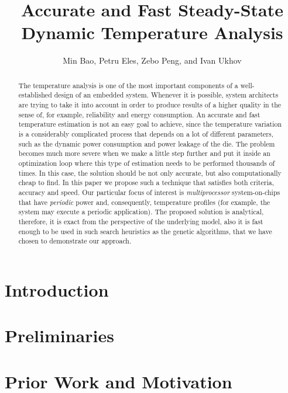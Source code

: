 \documentclass[conference]{IEEEtran}
\title{Accurate and Fast Steady-State\\Dynamic Temperature Analysis}
\author{Min Bao, Petru Eles, Zebo Peng, and Ivan Ukhov}
\begin{document}
  \maketitle

  \begin{abstract}
    The temperature analysis is one of the most important components of a well-established design of an embedded system. Whenever it is possible, system architects are trying to take it into account in order to produce results of a higher quality in the sense of, for example, reliability and energy consumption. An accurate and fast temperature estimation is not an easy goal to achieve, since the temperature variation is a considerably complicated process that depends on a lot of different parameters, such as the dynamic power consumption and power leakage of the die. The problem becomes much more severe when we make a little step further and put it inside an optimization loop where this type of estimation needs to be performed thousands of times. In this case, the solution should be not only accurate, but also computationally cheap to find. In this paper we propose such a technique that satisfies both criteria, accuracy and speed. Our particular focus of interest is \emph{multiprocessor} system-on-chips that have \emph{periodic} power and, consequently, temperature profiles (for example, the system may execute a periodic application). The proposed solution is analytical, therefore, it is exact from the perspective of the underlying model, also it is fast enough to be used in such search heuristics as the genetic algorithms, that we have chosen to demonstrate our approach.

  \end{abstract}

  \section{Introduction}
  

  \section{Preliminaries}
  

  \section{Prior Work and Motivation}
  
\end{document}
